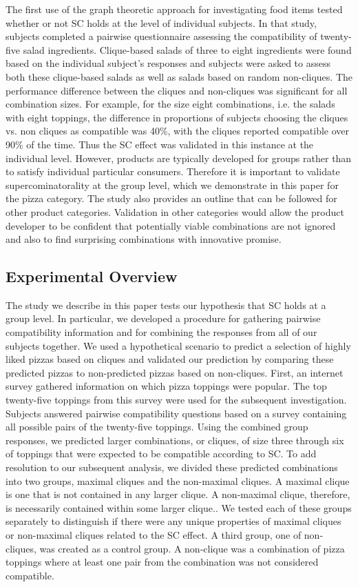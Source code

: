 The first use of the graph theoretic approach for investigating food items \citep{Nestrud2010a} tested whether or not SC holds at the level of individual subjects.  In that study, subjects completed a pairwise questionnaire assessing the compatibility of twenty-five salad ingredients.  Clique-based salads of three to eight ingredients were found based on the individual subject’s responses and subjects were asked to assess both these clique-based salads as well as salads based on random non-cliques. The performance difference between the cliques and non-cliques was significant for all combination sizes.  For example, for the size eight combinations, i.e. the salads with eight toppings, the difference in proportions of subjects choosing the cliques vs. non cliques as compatible was 40\%, with the cliques reported compatible over 90\% of the time.  Thus the SC effect was validated in this instance at the individual level.  However, products are typically developed for groups rather than to satisfy individual particular consumers.  Therefore it is important to validate supercominatorality at the group level, which we demonstrate in this paper for the pizza category.  The study also provides an outline that can be followed for other product categories.  Validation in other categories would allow the product developer to be confident that potentially viable combinations are not ignored and also to find surprising combinations with innovative promise.

\subsection{Experimental Overview}
The study we describe in this paper tests our hypothesis that SC holds at a group level.  In particular, we developed a procedure for gathering pairwise compatibility information and for combining the responses from all of our subjects together.  We used a hypothetical scenario to predict a selection of highly liked pizzas based on cliques and validated our prediction by comparing these predicted pizzas to non-predicted pizzas based on non-cliques.  First, an internet survey gathered information on which pizza toppings were popular.  The top twenty-five toppings from this survey were used for the subsequent investigation.  Subjects answered pairwise compatibility questions based on a survey containing all possible pairs of the  twenty-five toppings.  Using the combined group responses, we predicted larger combinations, or cliques, of size three through six of toppings that were expected to be compatible according to SC.  To add resolution to our subsequent analysis, we divided these predicted combinations into two groups, maximal cliques and the non-maximal cliques.  A maximal clique is one that is not contained in any larger clique.  A non-maximal clique, therefore, is necessarily contained within some larger clique..  We tested each of these groups separately to distinguish if there were any unique properties of maximal cliques or non-maximal cliques related to the SC effect.  A third group, one of non-cliques, was created as a control group.  A non-clique was a combination of pizza toppings where at least one pair from the combination was not considered compatible.  

